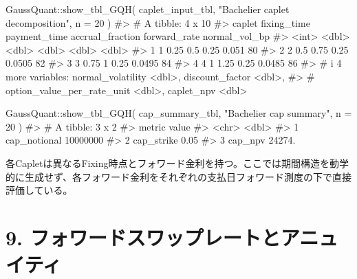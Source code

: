 \documentclass[
  letterpaper,
  DIV=11,
  numbers=noendperiod]{scrreprt}
\newenvironment{Shaded}{\begin{snugshade}}{\end{snugshade}}
\newcommand{\AttributeTok}[1]{\textcolor[rgb]{0.40,0.45,0.13}{#1}}
\newcommand{\CommentTok}[1]{\textcolor[rgb]{0.37,0.37,0.37}{#1}}
\newcommand{\DecValTok}[1]{\textcolor[rgb]{0.68,0.00,0.00}{#1}}
\newcommand{\FunctionTok}[1]{\textcolor[rgb]{0.28,0.35,0.67}{#1}}
\newcommand{\NormalTok}[1]{\textcolor[rgb]{0.00,0.23,0.31}{#1}}
\newcommand{\SpecialCharTok}[1]{\textcolor[rgb]{0.37,0.37,0.37}{#1}}
\newcommand{\StringTok}[1]{\textcolor[rgb]{0.13,0.47,0.30}{#1}}
\begin{document}
\begin{Shaded}
\begin{Highlighting}[]
\NormalTok{GaussQuant}\SpecialCharTok{::}\FunctionTok{show\_tbl\_GQH}\NormalTok{(}
\NormalTok{  caplet\_input\_tbl,}
  \StringTok{"Bachelier caplet decomposition"}\NormalTok{,}
  \AttributeTok{n =} \DecValTok{20}
\NormalTok{)}
\CommentTok{\#\textgreater{} \# A tibble: 4 x 10}
\CommentTok{\#\textgreater{}   caplet fixing\_time payment\_time accrual\_fraction forward\_rate normal\_vol\_bp}
\CommentTok{\#\textgreater{}    \textless{}int\textgreater{}       \textless{}dbl\textgreater{}        \textless{}dbl\textgreater{}            \textless{}dbl\textgreater{}        \textless{}dbl\textgreater{}         \textless{}dbl\textgreater{}}
\CommentTok{\#\textgreater{} 1      1        0.25         0.5              0.25       0.051             80}
\CommentTok{\#\textgreater{} 2      2        0.5          0.75             0.25       0.0505            82}
\CommentTok{\#\textgreater{} 3      3        0.75         1                0.25       0.0495            84}
\CommentTok{\#\textgreater{} 4      4        1            1.25             0.25       0.0485            86}
\CommentTok{\#\textgreater{} \# i 4 more variables: normal\_volatility \textless{}dbl\textgreater{}, discount\_factor \textless{}dbl\textgreater{},}
\CommentTok{\#\textgreater{} \#   option\_value\_per\_rate\_unit \textless{}dbl\textgreater{}, caplet\_npv \textless{}dbl\textgreater{}}

\NormalTok{GaussQuant}\SpecialCharTok{::}\FunctionTok{show\_tbl\_GQH}\NormalTok{(}
\NormalTok{  cap\_summary\_tbl,}
  \StringTok{"Bachelier cap summary"}\NormalTok{,}
  \AttributeTok{n =} \DecValTok{20}
\NormalTok{)}
\CommentTok{\#\textgreater{} \# A tibble: 3 x 2}
\CommentTok{\#\textgreater{}   metric             value}
\CommentTok{\#\textgreater{}   \textless{}chr\textgreater{}              \textless{}dbl\textgreater{}}
\CommentTok{\#\textgreater{} 1 cap\_notional 10000000   }
\CommentTok{\#\textgreater{} 2 cap\_strike          0.05}
\CommentTok{\#\textgreater{} 3 cap\_npv         24274.}
\end{Highlighting}
\end{Shaded}

各Capletは異なるFixing時点とフォワード金利を持つ。ここでは期間構造を動学的に生成せず、各フォワード金利をそれぞれの支払日フォワード測度の下で直接評価している。

\section{9.
フォワードスワップレートとアニュイティ}\label{ux30d5ux30a9ux30efux30fcux30c9ux30b9ux30efux30c3ux30d7ux30ecux30fcux30c8ux3068ux30a2ux30cbux30e5ux30a4ux30c6ux30a3}
\end{document}
